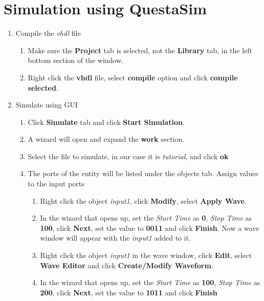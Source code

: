 \documentclass{article}
\begin{document}
	\section{Simulation using QuestaSim}
	\begin{enumerate}
		\item Compile the \textit{vhdl} file
		\begin{enumerate}
			\item Make sure the \textbf{Project} tab is selected, not the \textbf{Library} tab, in the left bottom section of the window.
			\item Right click the \textbf{vhdl} file, select \textbf{compile} option and click \textbf{compile selected}.
		\end{enumerate}
		\item Simulate using GUI
		\begin{enumerate}
			\item Click \textbf{Simulate} tab and click \textbf{Start Simulation}.
			\item A wizard will open and expand the \textbf{work} section. 
			\item Select the file to simulate, in our case it is \textit{tutorial}, and click \textbf{ok}
			\item The ports of the entity will be listed under the objects tab. Assign values to the input ports
			\begin{enumerate}
				\item Right click the object \textit{input1}, click \textbf{Modify}, select \textbf{Apply Wave}.
				\item In the wizard that opens up, set the \textit{Start Time} as \textbf{0}, \textit{Stop Time} as \textbf{100}, click \textbf{Next}, set the value to \textbf{0011} and click \textbf{Finish}. Now a wave window will appear with the \textit{input1} added to it.
				\item Right click the object \textit{input1} in the wave window, click \textbf{Edit}, select \textbf{Wave Editor} and click \textbf{Create/Modify Waveform}.
				\item In the wizard that opens up, set the \textit{Start Time} as \textbf{100}, \textit{Stop Time} as \textbf{200}, click \textbf{Next}, set the value to \textbf{1011} and click \textbf{Finish}
				

\end{enumerate}
\end{enumerate}
\end{enumerate}
\end{document}
